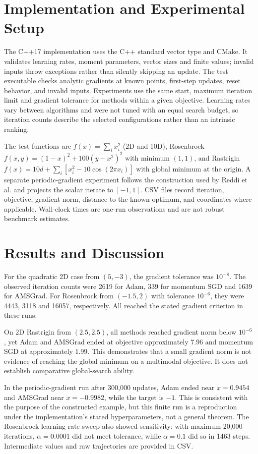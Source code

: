 ﻿\documentclass[conference]{IEEEtran}
\begin{document}
\section{Implementation and Experimental Setup}
The C++17 implementation uses the C++ standard vector type and CMake. It validates learning rates, moment parameters, vector sizes and finite values; invalid inputs throw exceptions rather than silently skipping an update. The test executable checks analytic gradients at known points, first-step updates, reset behavior, and invalid inputs. Experiments use the same start, maximum iteration limit and gradient tolerance for methods within a given objective. Learning rates vary between algorithms and were not tuned with an equal search budget, so iteration counts describe the selected configurations rather than an intrinsic ranking.

The test functions are $f(x)=\sum_i x_i^2$ (2D and 10D), Rosenbrock $f(x,y)=(1-x)^2+100(y-x^2)^2$ with minimum $(1,1)$, and Rastrigin $f(x)=10d+\sum_i[x_i^2-10\cos(2\pi x_i)]$ with global minimum at the origin. A separate periodic-gradient experiment follows the construction used by Reddi et al. and projects the scalar iterate to $[-1,1]$. CSV files record iteration, objective, gradient norm, distance to the known optimum, and coordinates where applicable. Wall-clock times are one-run observations and are not robust benchmark estimates.
\section{Results and Discussion}
For the quadratic 2D case from $(5,-3)$, the gradient tolerance was $10^{-8}$. The observed iteration counts were 2619 for Adam, 339 for momentum SGD and 1639 for AMSGrad. For Rosenbrock from $(-1.5,2)$ with tolerance $10^{-6}$, they were 4443, 3118 and 16057, respectively. All reached the stated gradient criterion in these runs.

On 2D Rastrigin from $(2.5,2.5)$, all methods reached gradient norm below $10^{-6}$, yet Adam and AMSGrad ended at objective approximately 7.96 and momentum SGD at approximately 1.99. This demonstrates that a small gradient norm is not evidence of reaching the global minimum on a multimodal objective. It does not establish comparative global-search ability.

In the periodic-gradient run after 300,000 updates, Adam ended near $x=0.9454$ and AMSGrad near $x=-0.9982$, while the target is $-1$. This is consistent with the purpose of the constructed example, but this finite run is a reproduction under the implementation's stated hyperparameters, not a general theorem. The Rosenbrock learning-rate sweep also showed sensitivity: with maximum 20,000 iterations, $\alpha=0.0001$ did not meet tolerance, while $\alpha=0.1$ did so in 1463 steps. Intermediate values and raw trajectories are provided in CSV.
\end{document}
